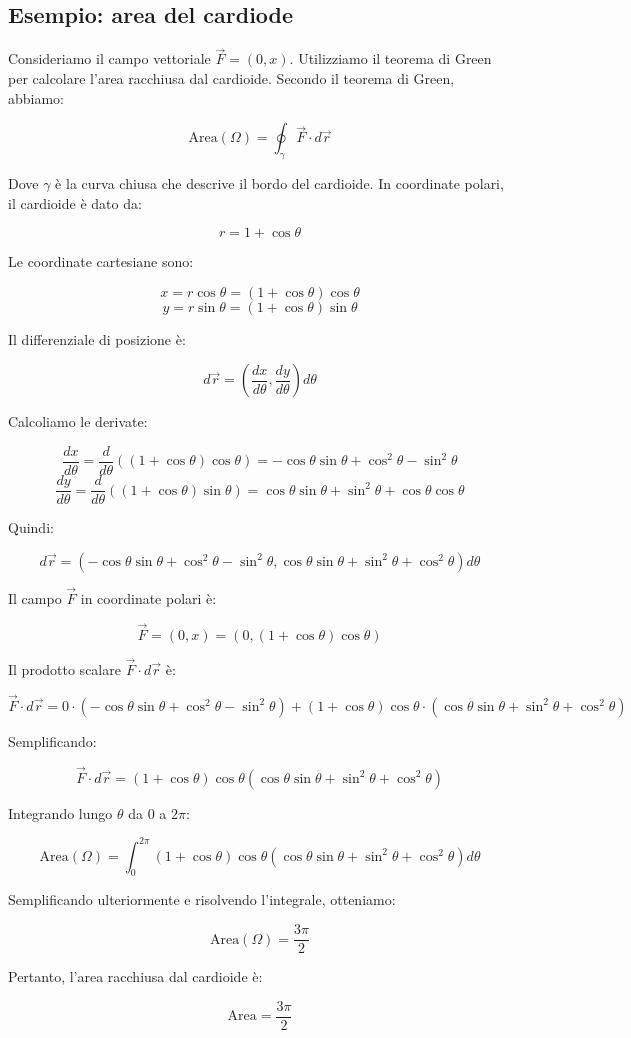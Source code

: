 \subsection{Esempio: area del cardiode}

Consideriamo il campo vettoriale $\vec{F} = (0, x)$. Utilizziamo il teorema di Green per calcolare l'area racchiusa dal cardioide. Secondo il teorema di Green, abbiamo:

$$ \text{Area}(\Omega) = \oint_{\gamma} \vec{F} \cdot d\vec{r} $$

Dove $\gamma$ è la curva chiusa che descrive il bordo del cardioide. In coordinate polari, il cardioide è dato da:

$$ r = 1 + \cos\theta $$

Le coordinate cartesiane sono:

$$ x = r \cos\theta = (1 + \cos\theta) \cos\theta $$
$$ y = r \sin\theta = (1 + \cos\theta) \sin\theta $$

Il differenziale di posizione è:

$$ d\vec{r} = \left( \frac{dx}{d\theta}, \frac{dy}{d\theta} \right) d\theta $$

Calcoliamo le derivate:

$$ \frac{dx}{d\theta} = \frac{d}{d\theta} \left( (1 + \cos\theta) \cos\theta \right) = -\cos\theta \sin\theta + \cos^2\theta - \sin^2\theta $$
$$ \frac{dy}{d\theta} = \frac{d}{d\theta} \left( (1 + \cos\theta) \sin\theta \right) = \cos\theta \sin\theta + \sin^2\theta + \cos\theta \cos\theta $$

Quindi:

$$ d\vec{r} = \left( -\cos\theta \sin\theta + \cos^2\theta - \sin^2\theta, \cos\theta \sin\theta + \sin^2\theta + \cos^2\theta \right) d\theta $$

Il campo $\vec{F}$ in coordinate polari è:

$$ \vec{F} = (0, x) = (0, (1 + \cos\theta) \cos\theta) $$

Il prodotto scalare $\vec{F} \cdot d\vec{r}$ è:

$$ \vec{F} \cdot d\vec{r} = 0 \cdot \left( -\cos\theta \sin\theta + \cos^2\theta - \sin^2\theta \right) + (1 + \cos\theta) \cos\theta \cdot \left( \cos\theta \sin\theta + \sin^2\theta + \cos^2\theta \right) $$

Semplificando:

$$ \vec{F} \cdot d\vec{r} = (1 + \cos\theta) \cos\theta \left( \cos\theta \sin\theta + \sin^2\theta + \cos^2\theta \right) $$

Integrando lungo $\theta$ da $0$ a $2\pi$:

$$ \text{Area}(\Omega) = \int_{0}^{2\pi} (1 + \cos\theta) \cos\theta \left( \cos\theta \sin\theta + \sin^2\theta + \cos^2\theta \right) d\theta $$

Semplificando ulteriormente e risolvendo l'integrale, otteniamo:

$$ \text{Area}(\Omega) = \frac{3\pi}{2} $$

Pertanto, l'area racchiusa dal cardioide è:

$$ \text{Area} = \frac{3\pi}{2} $$

